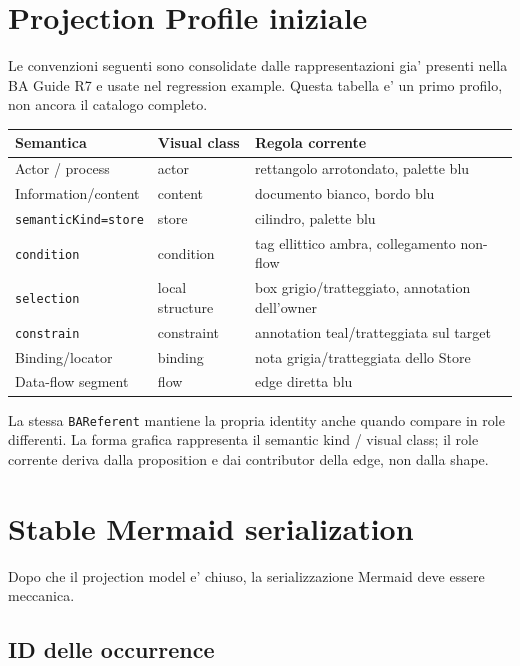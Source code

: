 \documentclass[11pt,a4paper]{article}
\newcommand{\BAR}{\texttt{BAReferent}}
\begin{document}
\clearpage
\section{Projection Profile iniziale}

Le convenzioni seguenti sono consolidate dalle rappresentazioni gia' presenti nella BA Guide R7 e usate nel regression example. Questa tabella e' un primo profilo, non ancora il catalogo completo.

\begin{tabularx}{\textwidth}{L{42mm}L{48mm}Y}
\toprule
\textbf{Semantica} & \textbf{Visual class} & \textbf{Regola corrente} \\
\midrule
Actor / process & actor & rettangolo arrotondato, palette blu \\
Information/content & content & documento bianco, bordo blu \\
\texttt{semanticKind=store} & store & cilindro, palette blu \\
\texttt{condition} & condition & tag ellittico ambra, collegamento non-flow \\
\texttt{selection} & local structure & box grigio/tratteggiato, annotation dell'owner \\
\texttt{constrain} & constraint & annotation teal/tratteggiata sul target \\
Binding/locator & binding & nota grigia/tratteggiata dello Store \\
Data-flow segment & flow & edge diretta blu \\
\bottomrule
\end{tabularx}

\begin{ddtaprinciple}[title={Shape non cambia role}]
La stessa \BAR{} mantiene la propria identity anche quando compare in role differenti. La forma grafica rappresenta il semantic kind / visual class; il role corrente deriva dalla proposition e dai contributor della edge, non dalla shape.
\end{ddtaprinciple}

\clearpage
\section{Stable Mermaid serialization}

Dopo che il projection model e' chiuso, la serializzazione Mermaid deve essere meccanica.

\subsection{ID delle occurrence}
\end{document}
